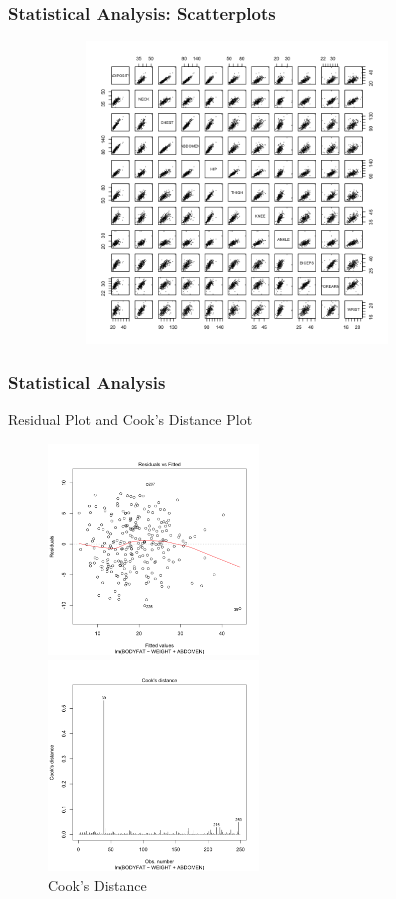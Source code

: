\documentclass{beamer}
\begin{document}
\begin{frame}
\frametitle{Statistical Analysis: Scatterplots}
\begin{itemize}
\begin{figure}
\centering
\includegraphics[height=8cm,width=10cm]{pairsplot.png}
\label{2}
\end{figure}
\end{itemize}
\end{frame}
\begin{frame}
\frametitle{Statistical Analysis}

\begin{block}{Residual Plot and Cook's Distance Plot}

\begin{figure}
\begin{minipage}[t]{0.5\linewidth}
\centering
\includegraphics[width=2.2in]{residualplot.png}
\caption{Residual Plot}
\label{fig:side:a}
\end{minipage}%
\begin{minipage}[t]{0.5\linewidth}
\centering
\includegraphics[width=2.2in]{cookplot}
\caption{Cook's Distance}
\label{fig:side:b}
\end{minipage}
\end{figure}

\end{block}
\end{frame}
\end{document}

